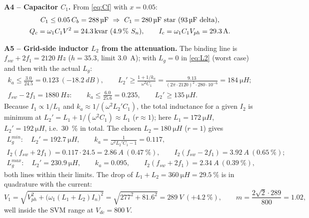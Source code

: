 \documentclass[10pt,a4paper]{scrartcl}
\newcommand{\Vdc}{V_{dc}}
\newcommand{\fsw}{f_{sw}}
\newcommand{\Lg}{L_{g}}
\begin{document}
\begin{onehalfspace}
\textbf{A4 -- Capacitor $C_1$.} From \eqref{eq:Cf} with $x = 0.05$:
\begin{gather*}
C_1 \le 0.05\,C_b = \SI{288}{\micro F}\ \Rightarrow\ C_1 = \SI{280}{\micro F}\ \text{star (\SI{93}{\micro F} delta)},\\
Q_c = \omega_1 C_1 V^2 = \SI{24.3}{kvar}\ (\SI{4.9}{\percent}\ S_n),\qquad I_c = \omega_1 C_1 V_{ph} = \SI{29.3}{A}.
\end{gather*}

\textbf{A5 -- Grid-side inductor $L_2$ from the attenuation.} The binding line is $\fsw + 2f_1 = \SI{2120}{Hz}$ ($h = 35.3$, limit \SI{3.0}{A}); with $\Lg = 0$ in \eqref{eq:L2} (worst case) and then with the actual $\Lg$:
\begin{gather*}
k_a \le \frac{3.0}{24.5} = 0.123\ (\SI{-18.2}{dB}),\qquad
L_2' \ge \frac{1 + 1/k_a}{\omega^2 C_1} = \frac{9.13}{(2\pi\cdot 2120)^2 \cdot 280\cdot 10^{-6}} = \SI{184}{\micro H};\\
\fsw - 2f_1 = \SI{1880}{Hz}:\qquad k_a \le \frac{6.0}{25.6} = 0.235,\qquad L_2' \ge \SI{135}{\micro H}.
\end{gather*}
Because $I_1 \propto 1/L_1$ and $k_a \approx 1/(\omega^2 L_2' C_1)$, the total inductance for a given $I_2$ is minimum at $L_2' = L_1 + 1/(\omega^2 C_1) \approx L_1$ ($r \approx 1$); here $L_1 = \SI{172}{\micro H}$, $L_2' = \SI{192}{\micro H}$, i.e.\ \SI{30}{\percent} in total. The chosen $L_2 = \SI{180}{\micro H}$ ($r = 1$) gives
\begin{gather*}
\Lg^{min}:\quad L_2' = \SI{192.7}{\micro H},\qquad k_a = \frac{1}{\omega^2 L_2' C_1 - 1} = 0.117,\\
I_2(\fsw + 2f_1) = 0.117 \cdot 24.5 = \SI{2.86}{A}\ (\SI{0.47}{\percent}),\qquad I_2(\fsw - 2f_1) = \SI{3.92}{A}\ (\SI{0.65}{\percent});\\
\Lg^{max}:\quad L_2' = \SI{230.9}{\micro H},\qquad k_a = 0.095,\qquad I_2(\fsw + 2f_1) = \SI{2.34}{A}\ (\SI{0.39}{\percent}),
\end{gather*}
both lines within their limits. The drop of $L_1 + L_2 = \SI{360}{\micro H} = \SI{29.5}{\percent}$ is in quadrature with the current:
\begin{equation*}
V_1 = \sqrt{V_{ph}^2 + \big(\omega_1 (L_1 + L_2) I_n\big)^2} = \sqrt{277^2 + 81.6^2} = \SI{289}{V}\ (+\SI{4.2}{\percent}),\qquad m = \frac{2\sqrt2 \cdot 289}{800} = 1.02,
\end{equation*}
well inside the SVM range at $\Vdc = \SI{800}{V}$.


\end{onehalfspace}
\end{document}
